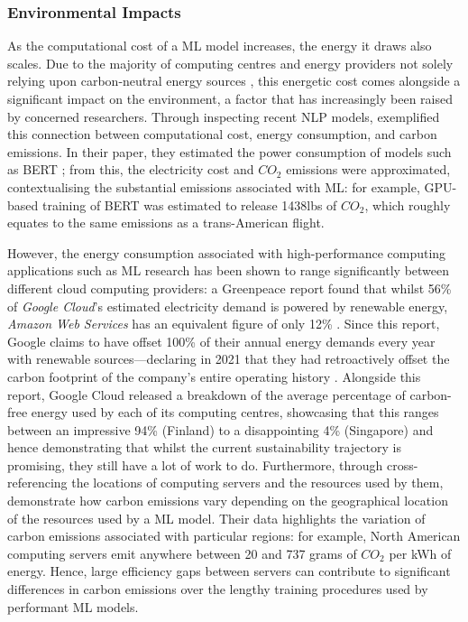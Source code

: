 \documentclass[a4paper, 12pt]{article}
\begin{document}
    \subsubsection{Environmental Impacts}

    As the computational cost of a ML model increases, the energy it draws also scales. Due to the majority of computing centres and energy providers not solely relying upon carbon-neutral energy sources \cite{strubell-2019}, this energetic cost comes alongside a significant impact on the environment, a factor that has increasingly been raised by concerned researchers. Through inspecting recent NLP models,  exemplified this connection between computational cost, energy consumption, and carbon emissions. In their paper, they estimated the power consumption of models such as BERT \cite{devlin-2019}; from this, the electricity cost and $CO_2$ emissions were approximated, contextualising the substantial emissions associated with ML: for example, GPU-based training of BERT was estimated to release 1438lbs of $CO_2$, which roughly equates to the same emissions as a trans-American flight.

    However, the energy consumption associated with high-performance computing applications such as ML research has been shown to range significantly between different cloud computing providers: a \citeyear{cook-2017} Greenpeace report found that whilst 56\% of \emph{Google Cloud}'s estimated electricity demand is powered by renewable energy, \emph{Amazon Web Services} has an equivalent figure of only 12\% \cite{cook-2017}. Since this report, Google claims to have offset 100\% of their annual energy demands every year with renewable sources---declaring in 2021 that they had retroactively offset the carbon footprint of the company's entire operating history \cite{google-2021}. Alongside this report, Google Cloud released a breakdown of the average percentage of carbon-free energy used by each of its computing centres, showcasing that this ranges between an impressive 94\% (Finland) to a disappointing 4\% (Singapore) and hence demonstrating that whilst the current sustainability trajectory is promising, they still have a lot of work to do. Furthermore, through cross-referencing the locations of computing servers and the resources used by them,  demonstrate how carbon emissions vary depending on the geographical location of the resources used by a ML model. Their data highlights the variation of carbon emissions associated with particular regions: for example, North American computing servers emit anywhere between 20 and 737 grams of $CO_2$ per kWh of energy. Hence, large efficiency gaps between servers can contribute to significant differences in carbon emissions over the lengthy training procedures used by performant ML models.
\end{document}
